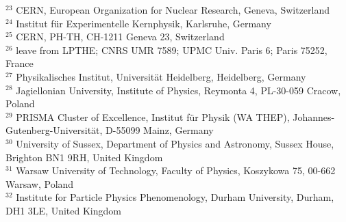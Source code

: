 { $ ^{23}$ CERN, European Organization for Nuclear Research, Geneva, Switzerland \\
 $ ^{24}$ Institut f\" ur Experimentelle Kernphysik, Karlsruhe, Germany \\
 $ ^{25}$ CERN, PH-TH, CH-1211 Geneva 23, Switzerland \\
 $ ^{26}$ leave from LPTHE; CNRS UMR 7589; UPMC Univ. Paris 6; Paris 75252, France \\
 $ ^{27}$ Physikalisches Institut, Universit\"at Heidelberg, Heidelberg, Germany \\
 $ ^{28}$ Jagiellonian University, Institute of Physics, Reymonta 4, PL-30-059 Cracow, Poland \\
 $ ^{29}$ PRISMA Cluster of Excellence, Institut f\"ur Physik (WA THEP), Johannes-Gutenberg-Universit\" at, D-55099 Mainz, Germany \\
 $ ^{30}$ University of Sussex, Department of Physics and Astronomy, Sussex House, Brighton BN1 9RH, United Kingdom \\
 $ ^{31}$ Warsaw University of Technology, Faculty of Physics, Koszykowa 75, 00-662 Warsaw, Poland \\
 $ ^{32}$ Institute for Particle Physics Phenomenology, Durham University, Durham, DH1 3LE, United Kingdom \\
}
%
